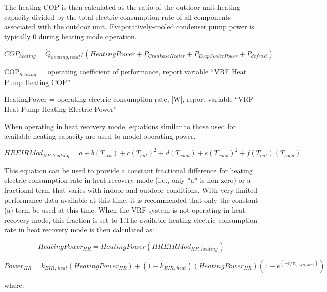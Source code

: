 The heating COP is then calculated as the ratio of the outdoor unit heating capacity divided by the total electric consumption rate of all components associated with the outdoor unit. Evaporatively-cooled condenser pump power is typically 0 during heating mode operation.

\begin{equation}
  COP_{heating} = \dot{Q}_{heating,total} / \left( HeatingPower + P_{CrankaseHeater} + P_{EvapCoolerPower} + P_{defrost} \right)
\end{equation}

COP\(_{heating}\) = operating coefficient of performance, report variable ``VRF Heat Pump Heating COP''

HeatingPower = operating electric consumption rate, [W], report variable ``VRF Heat Pump Heating Electric Power''

When operating in heat recovery mode, equations similar to those used for available heating capacity are used to model operating power.

\begin{equation}
  HREIRMod_{HP,heating} = a + b \left( T_{ent} \right) + c \left( T_{ent} \right)^2 + d \left( T_{cond} \right) + e \left( T_{cond} \right)^2 + f \left( T_{ent} \right) \left( T_{cond} \right)
\end{equation}

This equation can be used to provide a constant fractional difference for heating electric consumption rate in heat recovery mode (i.e., only *a* is non-zero) or a fractional term that varies with indoor and outdoor conditions. With very limited performance data available at this time, it is recommended that only the constant (a) term be used at this time. When the VRF system is not operating in heat recovery mode, this fraction is set to 1.The available heating electric consumption rate in heat recovery mode is then calculated as:

\begin{equation}
  HeatingPower_{HR} = HeatingPower \left( HREIRMod_{HP,\,heating} \right)
\end{equation}

\begin{equation}
  Power_{HR} = k_{EIR,\,heat} \left( HeatingPower_{HR} \right) + \left( 1 - k_{EIR,\,heat} \right) \left( HeatingPower_{HR} \right) \left( 1 - e^{\left( -t / \tau_{c,\,EIR,\,heat} \right)} \right)
\end{equation}

where:

